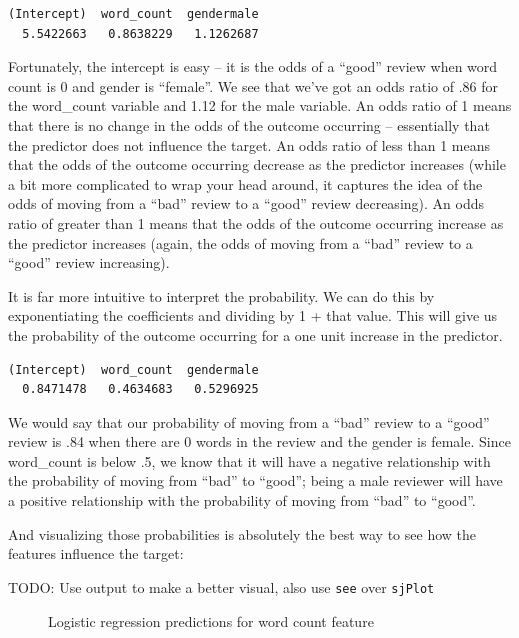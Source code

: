 \documentclass[
  letterpaper,
]{krantz}
\begin{document}
\begin{verbatim}
(Intercept)  word_count  gendermale 
  5.5422663   0.8638229   1.1262687 
\end{verbatim}

Fortunately, the intercept is easy -- it is the odds of a ``good''
review when word count is 0 and gender is ``female''. We see that we've
got an odds ratio of .86 for the word\_count variable and 1.12 for the
male variable. An odds ratio of 1 means that there is no change in the
odds of the outcome occurring -- essentially that the predictor does not
influence the target. An odds ratio of less than 1 means that the odds
of the outcome occurring decrease as the predictor increases (while a
bit more complicated to wrap your head around, it captures the idea of
the odds of moving from a ``bad'' review to a ``good'' review
decreasing). An odds ratio of greater than 1 means that the odds of the
outcome occurring increase as the predictor increases (again, the odds
of moving from a ``bad'' review to a ``good'' review increasing).

It is far more intuitive to interpret the probability. We can do this by
exponentiating the coefficients and dividing by 1 + that value. This
will give us the probability of the outcome occurring for a one unit
increase in the predictor.

\begin{verbatim}
(Intercept)  word_count  gendermale 
  0.8471478   0.4634683   0.5296925 
\end{verbatim}

We would say that our probability of moving from a ``bad'' review to a
``good'' review is .84 when there are 0 words in the review and the
gender is female. Since word\_count is below .5, we know that it will
have a negative relationship with the probability of moving from ``bad''
to ``good''; being a male reviewer will have a positive relationship
with the probability of moving from ``bad'' to ``good''.

And visualizing those probabilities is absolutely the best way to see
how the features influence the target:

TODO: Use output to make a better visual, also use \texttt{see} over
\texttt{sjPlot}

\begin{figure}[H]


\caption{\label{fig-logistic-regression-count}Logistic regression
predictions for word count feature}

\end{figure}%
\end{document}
